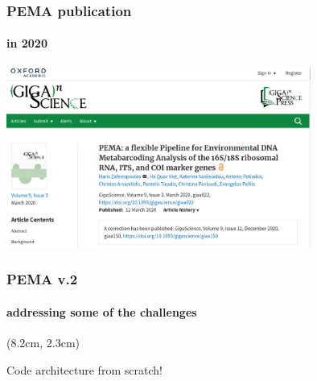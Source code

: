 \documentclass{beamer}
\begin{document}
   \begin{frame}
      \frametitle{PEMA publication}
      \framesubtitle{in 2020}
      \includegraphics[width=100mm]{resources/pema_publ.png}
   \end{frame}
   \fi 

   \begin{frame}
      \frametitle{PEMA v.2}
      \framesubtitle{addressing some of the challenges}

      \begin{singlespace}

         \begin{textblock*}{5cm}(8.2cm, 2.3cm) %
            
            \scriptsize Code architecture from scratch!

         \end{textblock*}

      \end{singlespace}
   \end{frame}
\end{document}
